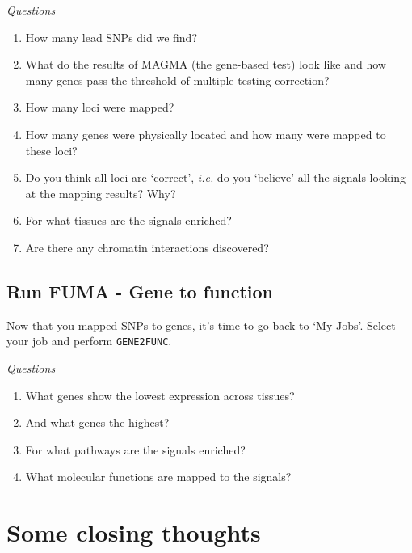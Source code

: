 \documentclass[
]{book}
\newcommand{\passthrough}[1]{#1}
\providecommand{\tightlist}{%
  \setlength{\itemsep}{0pt}\setlength{\parskip}{0pt}}
\begin{document}
\emph{Questions}

\begin{enumerate}
\def\labelenumi{\arabic{enumi}.}
\tightlist
\item
  How many lead SNPs did we find?
\item
  What do the results of MAGMA (the gene-based test) look like and how many genes pass the threshold of multiple testing correction?
\item
  How many loci were mapped?
\item
  How many genes were physically located and how many were mapped to these loci?
\item
  Do you think all loci are `correct', \emph{i.e.} do you `believe' all the signals looking at the mapping results? Why?
\item
  For what tissues are the signals enriched?
\item
  Are there any chromatin interactions discovered?
\end{enumerate}

\hypertarget{run-fuma---gene-to-function}{%
\subsection{Run FUMA - Gene to function}\label{run-fuma---gene-to-function}}

Now that you mapped SNPs to genes, it's time to go back to `My Jobs'. Select your job and perform \passthrough{\lstinline!GENE2FUNC!}.

\emph{Questions}

\begin{enumerate}
\def\labelenumi{\arabic{enumi}.}
\tightlist
\item
  What genes show the lowest expression across tissues?
\item
  And what genes the highest?
\item
  For what pathways are the signals enriched?
\item
  What molecular functions are mapped to the signals?
\end{enumerate}

\hypertarget{some-closing-thoughts}{%
\section{Some closing thoughts}\label{some-closing-thoughts}}
\end{document}
